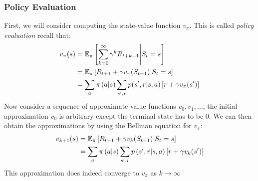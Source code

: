     \subsubsection{Policy Evaluation}
    First, we will consider computing the state-value function $v_\pi$. This is 
    called \textit{policy evaluation} recall that:
    \begin{align*}
    v_\pi(s) &= \mathbb{E}_\pi\left[\sum_{k=0}^{\infty}\gamma^kR_{t+k+1}\middle\vert S_t = 
    s\right]\\
        &= \mathbb{E}_\pi\left[R_{t+1}+\gamma v_\pi(S_{t+1}) 
        \middle\vert S_t=s\right]\\
        &= \sum_a \pi\left(a\middle\vert s\right) \sum_{s',r} p(s',r|s,a) 
        \left[r+\gamma v_\pi(s')\right]
    \end{align*}
    Now consider a sequence of approximate value functions $v_0,v_1,\dots$, the 
    initial approximation $v_0$ is arbitrary except the terminal state has to 
    be $0$. We can then obtain the approximations by using the Bellman equation 
    for $v_\pi$:
    \begin{align*}
        v_{k+1}(s)&= \mathbb{E}_\pi\left[R_{t+1}+\gamma v_k(S_{t+1}) \middle\vert S_t = s 
        \right]\\
            &=\sum_a \pi\left(a \middle\vert s\right)\sum_{s',r}p\left(s',r \middle\vert 
            s,a\right)\left[r+ \gamma v_k(s')\right]
    \end{align*}
    This approximation does indeed converge to $v_\pi$ as $k\rightarrow \infty$
    
